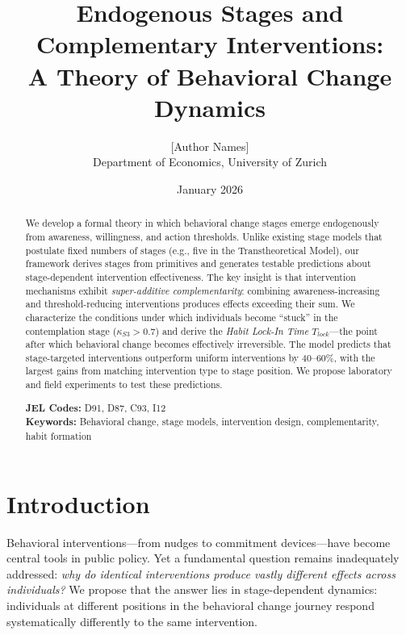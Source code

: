 \documentclass[12pt]{article}
\title{\textbf{Endogenous Stages and Complementary Interventions:\\
A Theory of Behavioral Change Dynamics}}
\author{
[Author Names]\\
Department of Economics, University of Zurich
}
\date{January 2026}
\begin{document}
\maketitle


\begin{abstract}
\noindent
We develop a formal theory in which behavioral change stages emerge endogenously from awareness, willingness, and action thresholds. Unlike existing stage models that postulate fixed numbers of stages (e.g., five in the Transtheoretical Model), our framework derives stages from primitives and generates testable predictions about stage-dependent intervention effectiveness. The key insight is that intervention mechanisms exhibit \textit{super-additive complementarity}: combining awareness-increasing and threshold-reducing interventions produces effects exceeding their sum. We characterize the conditions under which individuals become ``stuck'' in the contemplation stage ($\kappa_{S3} > 0.7$) and derive the \textit{Habit Lock-In Time} $T_{lock}$---the point after which behavioral change becomes effectively irreversible. The model predicts that stage-targeted interventions outperform uniform interventions by 40--60\%, with the largest gains from matching intervention type to stage position. We propose laboratory and field experiments to test these predictions.

\medskip
\noindent
\textbf{JEL Codes:} D91, D87, C93, I12\\
\textbf{Keywords:} Behavioral change, stage models, intervention design, complementarity, habit formation
\end{abstract}

\newpage


\section{Introduction}

Behavioral interventions---from nudges to commitment devices---have become central tools in public policy. Yet a fundamental question remains inadequately addressed: \textit{why do identical interventions produce vastly different effects across individuals?} We propose that the answer lies in stage-dependent dynamics: individuals at different positions in the behavioral change journey respond systematically differently to the same intervention.
\end{document}
